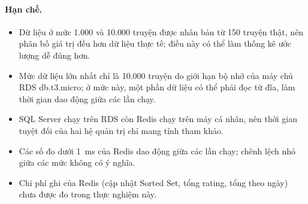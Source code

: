 \paragraph{Hạn chế.}
\begin{itemize}
    \item Dữ liệu ở mức 1.000 và 10.000 truyện được nhân bản từ 150 truyện thật, nên phân bố giá trị đều hơn dữ liệu thực tế; điều này có thể làm thống kê ước lượng dễ đúng hơn.
    \item Mức dữ liệu lớn nhất chỉ là 10.000 truyện do giới hạn bộ nhớ của máy chủ RDS db.t3.micro; ở mức này, một phần dữ liệu có thể phải đọc từ đĩa, làm thời gian dao động giữa các lần chạy.
    \item SQL Server chạy trên RDS còn Redis chạy trên máy cá nhân, nên thời gian tuyệt đối của hai hệ quản trị chỉ mang tính tham khảo.
    \item Các số đo dưới 1~ms của Redis dao động giữa các lần chạy; chênh lệch nhỏ giữa các mức không có ý nghĩa.
    \item Chi phí ghi của Redis (cập nhật Sorted Set, tổng rating, tổng theo ngày) chưa được đo trong thực nghiệm này.
\end{itemize}
